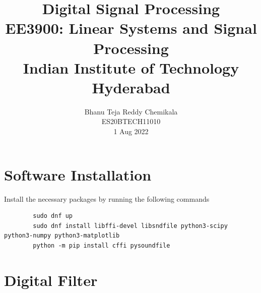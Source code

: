 \documentclass[journal,12pt,twocolumn]{IEEEtran}
\title{Digital Signal Processing \\ \Large EE3900: Linear Systems and Signal Processing \\ \large Indian Institute of Technology Hyderabad}
\author{Bhanu Teja Reddy Chemikala \\ \normalsize ES20BTECH11010 \\ \vspace*{20pt} \normalsize 1 Aug 2022}
\numberwithin{equation}{section}
\begin{document}
	\maketitle
	
	\section{Software Installation}
	Install the necessary packages by running the following commands
	\begin{lstlisting}
		sudo dnf up
		sudo dnf install libffi-devel libsndfile python3-scipy  python3-numpy python3-matplotlib 
		python -m pip install cffi pysoundfile 
	\end{lstlisting}

	\section{Digital Filter}
\end{document}
